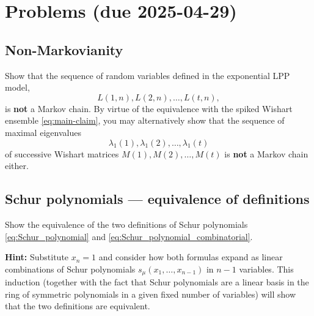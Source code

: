 \documentclass[letterpaper,11pt,oneside,reqno]{article}
\numberwithin{equation}{section}
\theoremstyle{definition}
\begin{document}
\appendix
\setcounter{section}{13}

\section{Problems (due 2025-04-29)}

\subsection{Non-Markovianity}

Show that the sequence of random variables defined in the exponential LPP model,
\[
L(1,n),L(2,n),\dots,L(t,n),
\]
is \textbf{not} a Markov chain.
By virtue of the equivalence with the spiked Wishart ensemble \eqref{eq:main-claim},
you may alternatively show that the sequence
of maximal eigenvalues
\[
\lambda_1(1),\lambda_1(2),\dots,\lambda_1(t)
\]
of successive
Wishart matrices $M(1),M(2),\dots,M(t)$ is \textbf{not} a Markov chain either.


\subsection{Schur polynomials --- equivalence of definitions}
\label{prob:Schur_polynomials_equivalence}

Show the equivalence of the two definitions of Schur polynomials \eqref{eq:Schur_polynomial} and \eqref{eq:Schur_polynomial_combinatorial}.

\medskip
\noindent
\textbf{Hint:}
Substitute $x_n=1$ and consider how both formulas
expand as linear combinations of Schur
polynomials
$s_\mu(x_1,\ldots,x_{n-1} )$
in $n-1$ variables.
This induction (together with the fact that
Schur polynomials are a linear basis in the ring
of symmetric polynomials in a given fixed number of variables)
will show that the two definitions are equivalent.
\end{document}
